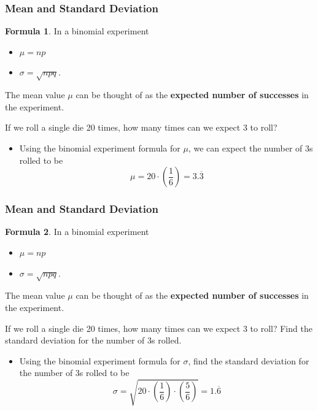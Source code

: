 \documentclass{beamer}
\theoremstyle{definition}
\newtheorem{formula}{Formula}
\begin{document}
\begin{frame}
\frametitle{Mean and Standard Deviation}\pause
\begin{formula}
In a binomial experiment
\begin{itemize}
\item $\mu=np$
\item $\sigma=\sqrt{npq}.$\pause
\end{itemize}
The mean value $\mu$ can be thought of as the \textbf{expected number of successes} in the experiment.
\end{formula}\pause
\begin{example}
If we roll a single die 20 times, how many times can we expect 3 to roll?
\end{example}\pause
\begin{itemize}
\item Using the binomial experiment formula for $\mu$, we can expect the number of 3s rolled to be 
$$\mu=20\cdot\left(\frac{1}{6}\right)=3.\overline{3}$$
\end{itemize}
\end{frame}

\begin{frame}
\frametitle{Mean and Standard Deviation}
\begin{formula}
In a binomial experiment
\begin{itemize}
\item $\mu=np$
\item $\sigma=\sqrt{npq}.$
\end{itemize}
The mean value $\mu$ can be thought of as the \textbf{expected number of successes} in the experiment.
\end{formula}
\begin{example}
If we roll a single die 20 times, how many times can we expect 3 to roll?  Find the standard deviation for the number of 3s rolled.
\end{example}\pause
\begin{itemize}
\item Using the binomial experiment formula for $\sigma$, find the standard deviation for the number of 3s rolled to be
$$\sigma=\sqrt{20\cdot\left(\frac{1}{6}\right)\cdot\left(\frac{5}{6}\right)}=1.\overline{6}$$
\end{itemize}
\end{frame}


 
\end{document}
